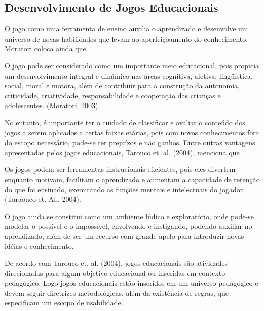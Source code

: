 \subsection{Desenvolvimento de Jogos Educacionais}
	
O jogo como uma ferramenta de ensino auxilia o aprendizado e desenvolve um universo de novas habilidades que levam ao aperfeiçoamento do conhecimento. Moratori coloca ainda que.

\begin{citacao}
O jogo pode ser considerado como um importante meio educacional, pois propicia um desenvolvimento integral e dinâmico nas áreas cognitiva, afetiva, lingüística, social, moral e motora, além de contribuir para a construção da autonomia, criticidade, criatividade, responsabilidade e cooperação das crianças e adolescentes. (Moratori, 2003).
\end{citacao}

No entanto, é importante ter o cuidado de classificar e avaliar o conteúdo dos jogos a serem aplicados a certas faixas etárias, pois com novos conhecimentos fora do escopo necessário, pode-se ter prejuízos e não ganhos. Entre outras vantagens apresentadas pelos jogos educacionais, Tarouco et. al. (2004), menciona que

\begin{citacao}
Os jogos podem ser ferramentas instrucionais eficientes, pois eles divertem enquanto motivam, facilitam o aprendizado e aumentam a capacidade de retenção do que foi ensinado, exercitando as funções mentais e intelectuais do jogador. (Taraouco et. Al., 2004).
\end{citacao}

O jogo ainda se constitui como um ambiente lúdico e exploratório, onde pode-se modelar o possível e o impossível, envolvendo e instigando, podendo auxiliar no aprendizado, além de ser um recurso com grande apelo para introduzir novas idéias e conhecimento.

De acordo com Tarouco et. al. (2004), jogos educacionais são atividades direcionadas para algum objetivo educacional ou inseridas em contexto pedagógico. Logo jogos educacionais estão inseridos em um universo pedagógico e devem seguir diretrizes metodológicas, além da existência de regras, que especificam um escopo de usabilidade.